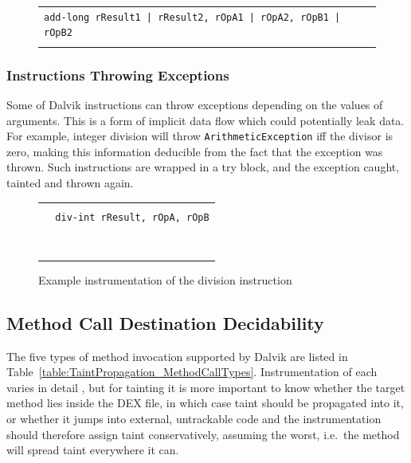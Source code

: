 \documentclass[12pt,twoside,notitlepage]{report}
\newcommand{\centerbox}[1] {
	\begin{center}
	\begin{footnotesize}
	\begin{tabular}{l}
	#1
	\end{tabular}
	\end{footnotesize}
	\end{center}
}
\newcommand{\highlight}[1]{\colorbox{lightOrange}{\strut #1}}
\newcommand{\asm}[1] {\texttt{#1}}
\newcommand{\asmExtra}[1] {\texttt{\highlight{#1}}}
\begin{document}
	\begin{figure}[H]
		\centerbox{
			\asm{add-long rResult1 | rResult2, rOpA1 | rOpA2, rOpB1 | rOpB2} \\
			\asmExtra{or-int~~~tResult1, tOpA1, tOpB1}
		}
	\end{figure}

\subsubsection{Instructions Throwing Exceptions}

Some of Dalvik instructions can throw exceptions depending on the values of arguments. This is a form of implicit data flow which could potentially leak data. For example, integer division will throw \verb$ArithmeticException$ iff the divisor is zero, making this information deducible from the fact that the exception was thrown. Such instructions are wrapped in a try block, and the exception caught, tainted and thrown again.

	\begin{figure}[H]
		\centerbox{
			\asmExtra{TRY (ArithmeticException $\Rightarrow$ CATCH\_ABC) \{} \\
			\asm{~~div-int rResult, rOpA, rOpB} \\
			\asmExtra{~~or-int tResult, tOpA, tOpB~~~~~~~~~~~~} \\
			\asmExtra{~~goto LABEL\_XYZ~~~~~~~~~~~~~~~~~~~~~~~~} \\
			\asmExtra{\}~~~~~~~~~~~~~~~~~~~~~~~~~~~~~~~~~~~~~~~} \\
			\asmExtra{CATCH\_ABC:~~~~~~~~~~~~~~~~~~~~~~~~~~~~~~} \\
			\asmExtra{move-exception pException~~~~~~~~~~~~~~~} \\
			\asmExtra{taint-set tOpB, pException~~~~~~~~~~~~~~} \\
			\asmExtra{throw pException~~~~~~~~~~~~~~~~~~~~~~~~} \\	
			\asmExtra{LABEL\_XYZ:~~~~~~~~~~~~~~~~~~~~~~~~~~~~~~}
		}
		\caption{Example instrumentation of the division instruction}
		\label{figure:TaintPropagation_ThrowingInstructions}
	\end{figure}

\subsection{Method Call Destination Decidability}
\label{section:TaintPropagation_DestDecision}

The five types of method invocation supported by Dalvik are listed in Table~\ref{table:TaintPropagation_MethodCallTypes}. Instrumentation of each varies in detail
, but for tainting it is more important to know whether the target method lies inside the DEX file, in which case taint should be propagated into it, or whether it jumps into external, untrackable code and the instrumentation should therefore assign taint conservatively, assuming the worst, i.e.\ the method will spread taint everywhere it can.
\end{document}
